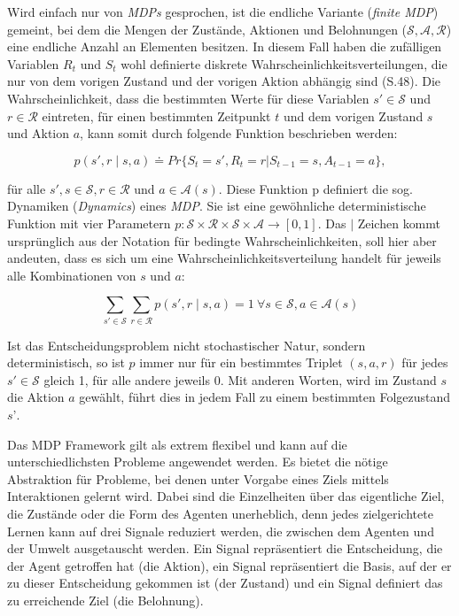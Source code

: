 Wird einfach nur von \textit{MDPs} gesprochen, ist die endliche Variante (\textit{finite MDP}) gemeint, bei dem die Mengen der Zustände, Aktionen und Belohnungen ($\mathcal{S}, \mathcal{A}, \mathcal{R}$) eine endliche Anzahl an Elementen besitzen. In diesem Fall haben die zufälligen Variablen $R_t$ und $S_t$ wohl definierte diskrete Wahrscheinlichkeitsverteilungen, die nur von dem vorigen Zustand und der vorigen Aktion abhängig sind (S.48). Die Wahrscheinlichkeit, dass die bestimmten Werte für diese Variablen $s' \in \mathcal{S}$ und $r \in \mathcal{R}$ eintreten, für einen bestimmten Zeitpunkt $t$ und dem vorigen Zustand $s$ und Aktion $a$, kann somit durch folgende Funktion beschrieben werden:

\begin{equation}\label{eq:übergangsfunktion}
p(s',r \mid s,a) \doteq Pr\{S_t=s',R_t=r|S_{t-1}=s,A_{t-1}=a\},
\end{equation}

für alle $s', s \in \mathcal{S}, r \in \mathcal{R}$ und $a \in \mathcal{A}(s)$. Diese Funktion p definiert die sog. Dynamiken (\textit{Dynamics}) eines \textit{MDP}. Sie ist eine gewöhnliche deterministische Funktion mit vier Parametern $p: \mathcal{S} \times \mathcal{R} \times \mathcal{S} \times \mathcal{A} \rightarrow [0,1]$. Das \glqq$\mid$\grqq{} Zeichen kommt ursprünglich aus der Notation für bedingte Wahrscheinlichkeiten, soll hier aber andeuten, dass es sich um eine Wahrscheinlichkeitsverteilung handelt für jeweils alle Kombinationen von $s$ und $a$:

\begin{equation}\label{eq:wahrscheinlichkeitsverteilung}
\sum_{s' \in \mathcal{S}} \sum_{r \in \mathcal{R}} p(s', r \mid s,a) = 1 \ \forall s \in \mathcal{S}, a \in \mathcal{A}(s)
\end{equation}

Ist das Entscheidungsproblem nicht stochastischer Natur, sondern deterministisch, so ist $p$ immer nur für ein bestimmtes Triplet $(s,a,r)$ für jedes $s' \in \mathcal{S}$ gleich 1, für alle andere jeweils 0. Mit anderen Worten, wird im Zustand $s$ die Aktion $a$ gewählt, führt dies in jedem Fall zu einem bestimmten Folgezustand $s’$. 
\par 

Das MDP Framework gilt als extrem flexibel und kann auf die unterschiedlichsten Probleme angewendet werden. Es bietet die nötige Abstraktion für Probleme, bei denen unter Vorgabe eines Ziels mittels Interaktionen gelernt wird. Dabei sind die Einzelheiten über das eigentliche Ziel, die Zustände oder die Form des Agenten unerheblich, denn jedes zielgerichtete Lernen kann auf drei Signale reduziert werden, die zwischen dem Agenten und der Umwelt ausgetauscht werden. Ein Signal repräsentiert die Entscheidung, die der Agent getroffen hat (die Aktion), ein Signal repräsentiert die Basis, auf der er zu dieser Entscheidung gekommen ist (der Zustand) und ein Signal definiert das zu erreichende Ziel (die Belohnung)\cite[S.~50]{Sutton1998}.

